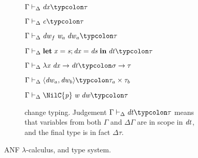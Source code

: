 \begin{figure}
\begin{subfigure}[t]{\textwidth}
\begin{typing}
  {\ensuremath{\Gamma\vdash_{\Delta}\Varid{dx}\typcolon\tau}}

 {\ensuremath{\Gamma\vdash_{\Delta}\Varid{c}\typcolon\tau}}


  {\ensuremath{\Gamma\vdash_{\Delta}\Varid{dw}_f\;\Varid{w}_a\;\Varid{dw}_a\typcolon\tau}}

  {\ensuremath{\Gamma\vdash_{\Delta}\mathbf{let}\;\Varid{x}\mathrel{=}\Varid{s};\Varid{dx}\mathrel{=}\Varid{ds}\;\mathbf{in}\;\Varid{dt}\typcolon\tau}}

  {\ensuremath{\Gamma\vdash_{\Delta}\lambda \Varid{x}\;\Varid{dx}\to \Varid{dt}\typcolon\sigma\to \tau}}

  {\ensuremath{\Gamma\vdash_{\Delta}\langle\Varid{dw}_a,\Varid{dw}_b\rangle\typcolon\tau_a\times\tau_b}}

 {\ensuremath{\Gamma\vdash_{\Delta}\NilC{\Varid{p}}\;\Varid{w}\;\Varid{dw}\typcolon\tau}}
\end{typing}
\caption{\dilcTau{} change typing. Judgement \ensuremath{\Gamma\vdash_{\Delta}\Varid{dt}\typcolon\tau} means that variables from
  both \ensuremath{\Gamma} and \ensuremath{\Delta \Gamma} are in scope in \ensuremath{\Varid{dt}}, and the final type is in fact
  \ensuremath{\Delta \tau}.}
\label{sfig:anf-change-typing}
\end{subfigure}

\caption{ANF $\lambda$-calculus, \ilcTau{} and \dilcTau{} type system.}
\label{fig:anf-lambda-calculus-typing}
\end{figure}



